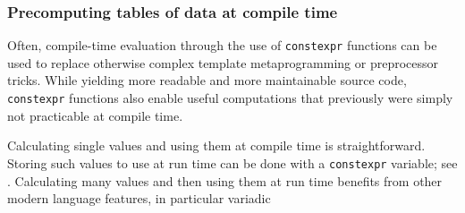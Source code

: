 \subsubsection[Precomputing tables of data at compile time]{Precomputing tables of data at compile time}\label{precomputing-tables-of-data-at-compile-time}

Often, compile-time evaluation through the use of \lstinline!constexpr!
functions can be used to replace otherwise complex template
metaprogramming or preprocessor tricks. While yielding more readable and
more maintainable source code, \lstinline!constexpr! functions also enable
useful computations that previously were simply not practicable at
compile time.

Calculating single values and using them at compile time is
straightforward. Storing such values to use at run time can be done with
a \lstinline!constexpr! variable; see . Calculating many values and then using them at run time
benefits from other modern language features, in particular variadic
